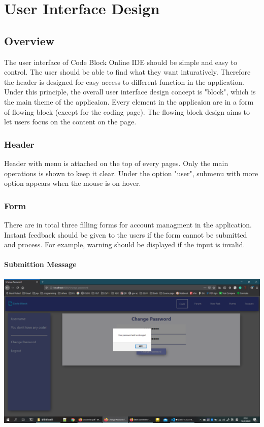 \chapter{User Interface Design}
\section{Overview}
The user interface of Code Block Online IDE should be simple and easy to control. The user should be able to find what they want inturatively. Therefore the header is designed for easy access to different function in the application. Under this principle, the overall user interface design concept is "block", which is the main theme of the applicaion. Every element in the applicaion are in a form of flowing block (except for the coding page). The flowing block design aims to let users focus on the content on the page.

\subsection{Header}
Header with menu is attached on the top of every pages. Only the main operations is shown to keep it clear. Under the option "user", submenu with more option appears when the mouse is on hover.

\subsection{Form}
There are in total three filling forms for account managment in the application. Instant feedback should be given to the users if the form cannot be submitted and process. For example, warning should be displayed if the input is invalid.
\subsubsection{Submittion Message}
\includegraphics[scale=0.45]{Doc/Pics/change_pw_sign.png}

